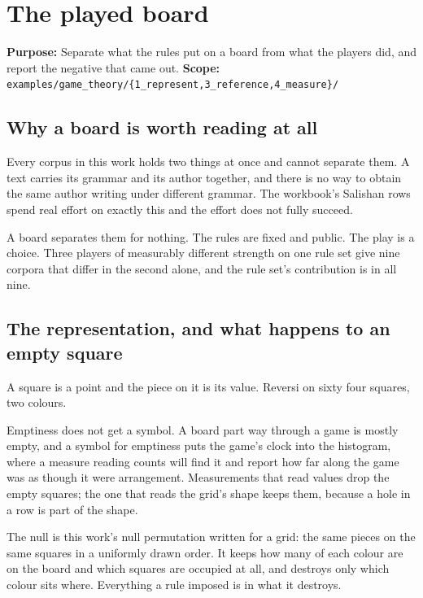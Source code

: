 \chapter{The played board}

\textbf{Purpose:} Separate what the rules put on a board from what the players did, and report the
negative that came out. \textbf{Scope:}
\texttt{examples/\allowbreak{}game\_\allowbreak{}theory/\allowbreak{}\{1\_\allowbreak{}represent,3\_\allowbreak{}reference,4\_\allowbreak{}measure\}/\allowbreak{}}

\section{Why a board is worth reading at all}

Every corpus in this work holds two things at once and cannot separate them. A text carries its
grammar and its author together, and there is no way to obtain the same author writing under
different grammar. The workbook's Salishan rows spend real effort on exactly this and the effort does
not fully succeed.

A board separates them for nothing. The rules are fixed and public. The play is a choice. Three
players of measurably different strength on one rule set give nine corpora that differ in the second
alone, and the rule set's contribution is in all nine.

\section{The representation, and what happens to an empty square}

A square is a point and the piece on it is its value. Reversi on sixty four squares, two colours.

Emptiness does not get a symbol. A board part way through a game is mostly empty, and a symbol for
emptiness puts the game's clock into the histogram, where a measure reading counts will find it and
report how far along the game was as though it were arrangement. Measurements that read values drop
the empty squares; the one that reads the grid's shape keeps them, because a hole in a row is part
of the shape.

The null is this work's null permutation written for a grid: the same pieces on the same squares in
a uniformly drawn order. It keeps how many of each colour are on the board and which squares are
occupied at all, and destroys only which colour sits where. Everything a rule imposed is in what it
destroys.


